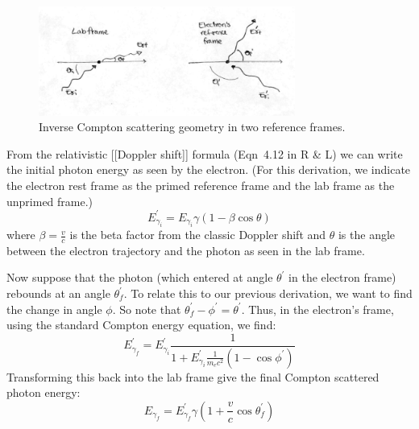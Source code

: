 \documentclass{article}
\begin{document}
\begin{figure}
    \centering
    \includegraphics[width=0.75\textwidth]{800px-InverseCompton.png}
    \caption{Inverse Compton scattering geometry in two reference frames.
}
    \label{fig:invcomp}
\end{figure}


From the relativistic [[Doppler shift]] formula (Eqn~4.12 in R \& L) we can write the initial photon energy as seen by the electron. (For this derivation, we indicate the electron rest frame as the primed reference frame and the lab frame as the unprimed frame.)
$$ E^\prime_{\gamma_i} = E_{\gamma_i} \gamma (1-\beta \cos \theta)$$
where $\beta = \frac{v}{c}$ is the beta factor from the classic Doppler shift and $\theta$ is the angle between the electron trajectory and the photon as seen in the lab frame.

Now suppose that the photon (which entered at angle $\theta^\prime$ in the 
electron frame) rebounds at an angle $\theta_f^\prime$.  To relate this to
our previous derivation, we want to find the change in angle $\phi$.  So note that 
$\theta_f^\prime-\phi^\prime=\theta^\prime$.  Thus, in the electron's frame, using the standard Compton energy equation, we find:
$$E_{\gamma_f}^\prime={E_{\gamma_i}^\prime \frac{1}{1+{E_{\gamma_i}^\prime \frac{1}{ m_ec^2}(1-\cos\phi^\prime)}}}$$
Transforming this back into the lab frame give the final Compton scattered photon energy:
$$E_{\gamma_f}=E_{\gamma_f}^\prime\gamma(1+\frac{v}{ c}\cos\theta_f^\prime)$$
\end{document}
